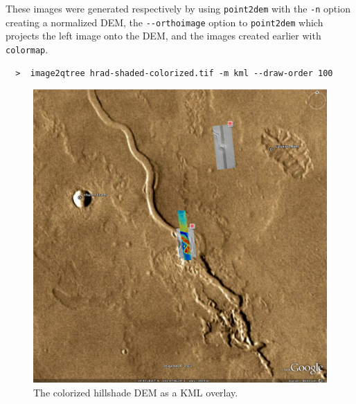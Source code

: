 These images were generated respectively by using \texttt{point2dem}
with the \texttt{-n} option creating a normalized DEM, the
\texttt{-\/-orthoimage} option to \texttt{point2dem} which projects the
left image onto the DEM, and the images created earlier with
\texttt{colormap}.

\begin{verbatim}
  >  image2qtree hrad-shaded-colorized.tif -m kml --draw-order 100
\end{verbatim}

\begin{figure}[b!]
\begin{center}
\includegraphics[width=6in]{images/p19-googlemars.png}
\caption[Hrad shaded colorized DEM as a KML overlay] {
    \label{hrad-kml}
        The colorized hillshade DEM as a KML overlay.  }
\end{center}
\end{figure}
